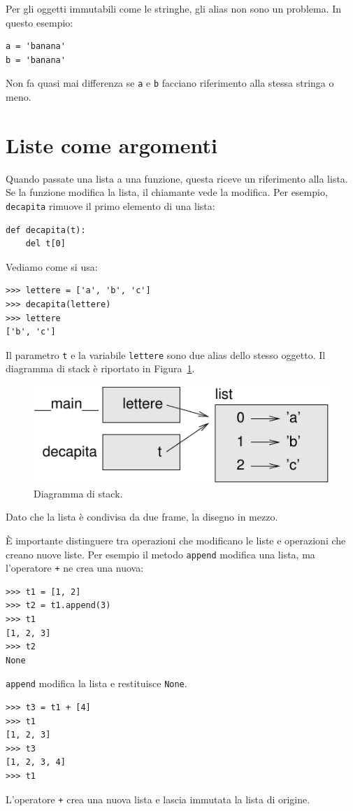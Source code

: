 \documentclass[10pt]{book}
\begin{document}
Per gli oggetti immutabili come le stringhe, gli alias non sono un problema. In questo esempio:

\begin{verbatim}
a = 'banana'
b = 'banana'
\end{verbatim}
%
Non fa quasi mai differenza se {\tt a} e {\tt b} facciano riferimento alla stessa stringa o meno.


\section{Liste come argomenti}
\label{list.arguments}

Quando passate una lista a una funzione, questa riceve un riferimento alla lista. Se la funzione modifica la lista, il chiamante vede la modifica. Per esempio, \verb"decapita" rimuove il primo elemento di una lista:

\begin{verbatim}
def decapita(t):
    del t[0]
\end{verbatim}
%
Vediamo come si usa:

\begin{verbatim}
>>> lettere = ['a', 'b', 'c']
>>> decapita(lettere)
>>> lettere
['b', 'c']
\end{verbatim}
%
Il parametro {\tt t} e la variabile {\tt lettere} sono due alias dello stesso oggetto. Il diagramma di stack è riportato in Figura~\ref{fig.stack5}.

\begin{figure}
\centerline
{\includegraphics[scale=0.8]{figs/stack5.pdf}}
\caption{Diagramma di stack.}
\label{fig.stack5}
\end{figure}


Dato che la lista è condivisa da due frame, la disegno in mezzo.

È importante distinguere tra operazioni che modificano le liste e operazioni che creano nuove liste. Per esempio il metodo {\tt append} modifica una lista, ma l'operatore {\tt +} ne crea una nuova:
%
\begin{verbatim}
>>> t1 = [1, 2]
>>> t2 = t1.append(3)
>>> t1
[1, 2, 3]
>>> t2
None
\end{verbatim}
%
{\tt append} modifica la lista e restituisce {\tt None}.
%
\begin{verbatim}
>>> t3 = t1 + [4]
>>> t1
[1, 2, 3]
>>> t3
[1, 2, 3, 4]
>>> t1
\end{verbatim}
%
L'operatore {\tt +} crea una nuova lista e lascia immutata la lista di origine.
\end{document}
